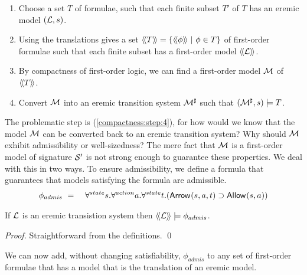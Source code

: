 \begin{enumerate}

\item Choose a set $T$ of \ELABR{} formulae, such that each finite
  subset $T'$ of $T$ has an eremic model $(\mathcal{L}, s)$.

\item Using the translations gives a set $\langle\!\langle T \rangle\!\rangle =
  \{\langle\!\langle \phi \rangle\!\rangle\ |\ \phi \in T\}$ of first-order formulae such that
  each finite subset has a first-order model $\langle\!\langle \mathcal{L} \rangle\!\rangle$.

\item By compactness of first-order logic, we can find a first-order
  model $\mathcal{M}$ of $\langle\!\langle T \rangle\!\rangle$.

\item\label{compactness:step:4} Convert $\mathcal{M}$ into an eremic transition system
  $\mathcal{M}^{\sharp}$ such that $(\mathcal{M}^{\sharp}, s) \models T$.

\end{enumerate}

\NI The problematic step is (\ref{compactness:step:4}), for how would
we know that the model $\mathcal{M}$ can be converted back to an eremic
transition system? Why should $\mathcal{M}$ exhibit admissibility or
well-sizedness?  The mere fact that $\mathcal{M}$ is a first-order model
of signature $\mathcal{S}'$ is not strong enough to guarantee these
properties.  We deal with this in two ways. To ensure admissibility,
we define a formula that guarantees that models satisfying the formula
are admissible.
\begin{eqnarray*}
   \phi_{admis} 
      & \ =\ &
   \forall^{state} s.\forall^{action} a.\forall^{state} t.( \mathsf{Arrow}^{}(s, a, t) \supset \mathsf{Allow}^{}(s, a))
\end{eqnarray*}

\begin{lemma}\label{compactness:lemma:23399}
If $\mathcal{L}$ is an eremic transistion system then $\langle\!\langle \mathcal{L} \rangle\!\rangle \models
\phi_{admis}$.
\end{lemma}

\begin{proof}
Straightforward from the definitions.
\qed
\end{proof}

\NI We can now add, without changing satisfiability, $\phi_{admis}$ to
any set of first-order formulae that has a model that is the
translation of an eremic model.


